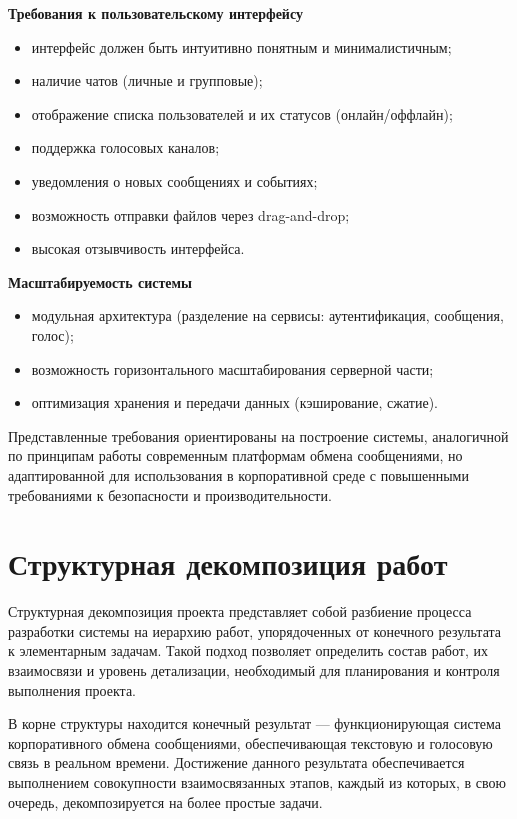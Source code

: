 \documentclass[14pt,a4paper]{extarticle}
\begin{document}
\textbf{Требования к пользовательскому интерфейсу}

\begin{itemize}
\item интерфейс должен быть интуитивно понятным и минималистичным;
\item наличие чатов (личные и групповые);
\item отображение списка пользователей и их статусов (онлайн/оффлайн);
\item поддержка голосовых каналов;
\item уведомления о новых сообщениях и событиях;
\item возможность отправки файлов через drag-and-drop;
\item высокая отзывчивость интерфейса.
\end{itemize}

\textbf{Масштабируемость системы}

\begin{itemize}
\item модульная архитектура (разделение на сервисы: аутентификация, сообщения, голос);
\item возможность горизонтального масштабирования серверной части;
\item оптимизация хранения и передачи данных (кэширование, сжатие).
\end{itemize}

Представленные требования ориентированы на построение системы, аналогичной по принципам работы современным платформам обмена сообщениями, но адаптированной для использования в корпоративной среде с повышенными требованиями к безопасности и производительности.

\newpage
\section{Структурная декомпозиция работ}

Структурная декомпозиция проекта представляет собой разбиение процесса разработки системы на иерархию работ, упорядоченных от конечного результата к элементарным задачам. Такой подход позволяет определить состав работ, их взаимосвязи и уровень детализации, необходимый для планирования и контроля выполнения проекта.

В корне структуры находится конечный результат — функционирующая система корпоративного обмена сообщениями, обеспечивающая текстовую и голосовую связь в реальном времени. Достижение данного результата обеспечивается выполнением совокупности взаимосвязанных этапов, каждый из которых, в свою очередь, декомпозируется на более простые задачи.
\end{document}
